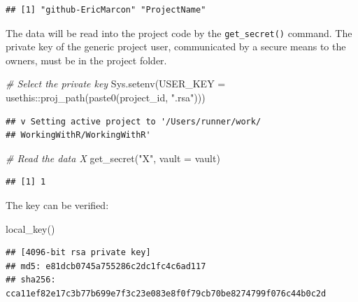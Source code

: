\documentclass[
  12pt,
  american,
  a4paper,
  extrafontsizes,onecolumn,openright
  ]{memoir}
\newenvironment{Shaded}{\begin{snugshade}}{\end{snugshade}}
\newcommand{\AttributeTok}[1]{\textcolor[rgb]{0.77,0.63,0.00}{#1}}
\newcommand{\CommentTok}[1]{\textcolor[rgb]{0.56,0.35,0.01}{\textit{#1}}}
\newcommand{\FunctionTok}[1]{\textcolor[rgb]{0.00,0.00,0.00}{#1}}
\newcommand{\NormalTok}[1]{#1}
\newcommand{\SpecialCharTok}[1]{\textcolor[rgb]{0.00,0.00,0.00}{#1}}
\newcommand{\StringTok}[1]{\textcolor[rgb]{0.31,0.60,0.02}{#1}}
\begin{document}
\begin{verbatim}
## [1] "github-EricMarcon" "ProjectName"
\end{verbatim}

\normalsize

The data will be read into the project code by the \texttt{get\_secret()} command.
The private key of the generic project user, communicated by a secure means to the owners, must be in the project folder.

\scriptsize

\begin{Shaded}
\begin{Highlighting}[]
\CommentTok{\# Select the private key}
\FunctionTok{Sys.setenv}\NormalTok{(}\AttributeTok{USER\_KEY =}\NormalTok{ usethis}\SpecialCharTok{::}\FunctionTok{proj\_path}\NormalTok{(}\FunctionTok{paste0}\NormalTok{(project\_id, }\StringTok{".rsa"}\NormalTok{)))}
\end{Highlighting}
\end{Shaded}

\begin{verbatim}
## v Setting active project to '/Users/runner/work/
## WorkingWithR/WorkingWithR'
\end{verbatim}

\begin{Shaded}
\begin{Highlighting}[]
\CommentTok{\# Read the data \textquotesingle{}X}
\FunctionTok{get\_secret}\NormalTok{(}\StringTok{"X"}\NormalTok{, }\AttributeTok{vault =}\NormalTok{ vault)}
\end{Highlighting}
\end{Shaded}

\begin{verbatim}
## [1] 1
\end{verbatim}

\normalsize

The key can be verified:

\scriptsize

\begin{Shaded}
\begin{Highlighting}[]
\FunctionTok{local\_key}\NormalTok{()}
\end{Highlighting}
\end{Shaded}

\begin{verbatim}
## [4096-bit rsa private key]
## md5: e81dcb0745a755286c2dc1fc4c6ad117
## sha256: cca11ef82e17c3b77b699e7f3c23e083e8f0f79cb70be8274799f076c44b0c2d
\end{verbatim}
\end{document}
